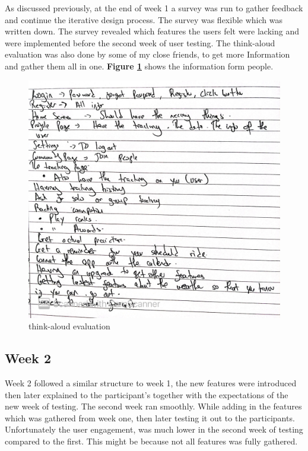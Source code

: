 \documentclass{l4proj}
\begin{document}
As discussed previously, at the end of week 1 a survey was run to gather feedback and continue the iterative design process. The survey was flexible which was written down.  The survey revealed which features the users felt were lacking and were implemented before the second week of user testing. The think-aloud evaluation was also done by some of my close friends, to get more Information and gather them all in one. \textbf{Figure \ref{fig:Gettingideas}} shows the information form people.  
\begin{figure}
    \centering
     \includegraphics[width=1\textwidth]{images/think.JPG}
     \caption{think-aloud evaluation }
    \label{fig:Gettingideas}
\end{figure}


\subsection{Week 2}\label{UsabilityTestingWeekTwo}
Week 2 followed a similar structure to week 1, the new features were introduced then later explained to the participant's together with the expectations of the new week of testing. The second week ran smoothly. 
While adding in the features which was gathered from week one, then later testing it out to the participants. 
Unfortunately the user engagement, was much lower in the second week of testing compared to the first. This might  be because not all features was fully gathered. 
\end{document}
